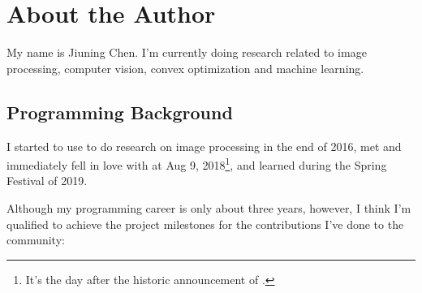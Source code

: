 
\section{About the Author}\label{sec:about_author}

My name is \textsf{Jiuning Chen}. I'm currently doing research related to image processing, computer vision, convex optimization and machine learning.\par

\subsection{Programming Background}

I started to use \langmatlab to do research on image processing in the end of 2016, met and immediately fell in love with \langjulia at Aug 9, 2018\footnote{It's the day after the historic announcement of \langjulia {}.}, and learned \langpython during the Spring Festival of 2019. \par

Although my programming career is only about three years, however, I think I'm qualified to achieve the project milestones for the contributions I've done to the \langjulia{} community:

